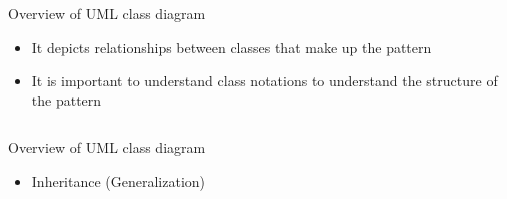 \documentclass[13pt]{beamer}
\begin{document}
\begin{frame}{Overview of UML class diagram}
	\begin{itemize}
		\item It depicts relationships between classes that make up the pattern
		\item It is important to understand class notations to understand the structure of the 				  pattern
	\end{itemize}
	
\begin{columns}[T] %
\begin{column}{.5\textwidth}                                               
  	\begin{center}
	\end{center}                                                               
\end{column}%
                                                                           
\begin{column}{.5\textwidth}                                              
  	\begin{center}
	\end{center}                            
\end{column}%
\hfill%
\end{columns}
\end{frame}

\begin{frame}{Overview of UML class diagram}
	\begin{itemize}
		\item Inheritance (Generalization)
	\end{itemize}
	
	\begin{center}
	\end{center}
\end{frame}
\end{document}
